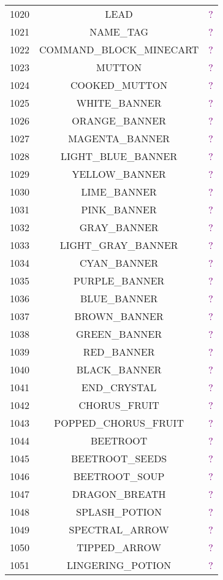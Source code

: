 \documentclass[11pt]{article}
\newcommand\myworries[1]{\textcolor{purple}{#1}}
\begin{document}
\begin{longtable}{ |c|c|c| }
	1020 & LEAD & \myworries{?} \\
	1021 & NAME\_TAG & \myworries{?} \\
	1022 & COMMAND\_BLOCK\_MINECART & \myworries{?} \\
	1023 & MUTTON & \myworries{?} \\
	1024 & COOKED\_MUTTON & \myworries{?} \\
	1025 & WHITE\_BANNER & \myworries{?} \\
	1026 & ORANGE\_BANNER & \myworries{?} \\
	1027 & MAGENTA\_BANNER & \myworries{?} \\
	1028 & LIGHT\_BLUE\_BANNER & \myworries{?} \\
	1029 & YELLOW\_BANNER & \myworries{?} \\
	1030 & LIME\_BANNER & \myworries{?} \\
	1031 & PINK\_BANNER & \myworries{?} \\
	1032 & GRAY\_BANNER & \myworries{?} \\
	1033 & LIGHT\_GRAY\_BANNER & \myworries{?} \\
	1034 & CYAN\_BANNER & \myworries{?} \\
	1035 & PURPLE\_BANNER & \myworries{?} \\
	1036 & BLUE\_BANNER & \myworries{?} \\
	1037 & BROWN\_BANNER & \myworries{?} \\
	1038 & GREEN\_BANNER & \myworries{?} \\
	1039 & RED\_BANNER & \myworries{?} \\
	1040 & BLACK\_BANNER & \myworries{?} \\
	1041 & END\_CRYSTAL & \myworries{?} \\
	1042 & CHORUS\_FRUIT & \myworries{?} \\
	1043 & POPPED\_CHORUS\_FRUIT & \myworries{?} \\
	1044 & BEETROOT & \myworries{?} \\
	1045 & BEETROOT\_SEEDS & \myworries{?} \\
	1046 & BEETROOT\_SOUP & \myworries{?} \\
	1047 & DRAGON\_BREATH & \myworries{?} \\
	1048 & SPLASH\_POTION & \myworries{?} \\
	1049 & SPECTRAL\_ARROW & \myworries{?} \\
	1050 & TIPPED\_ARROW & \myworries{?} \\
	1051 & LINGERING\_POTION & \myworries{?} \\

\end{longtable}
\end{document}
